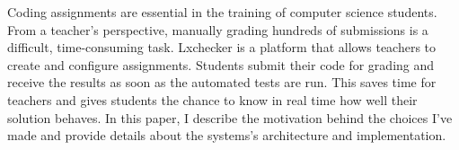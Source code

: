 
Coding assignments are essential in the training of computer science students. From a teacher's perspective, manually grading hundreds of submissions is a difficult, time-consuming task. Lxchecker is a platform that allows teachers to create and configure assignments. Students submit their code for grading and receive the results as soon as the automated tests are run. This saves time for teachers and gives students the chance to know in real time how well their solution behaves. In this paper, I describe the motivation behind the choices I've made and provide details about the systems's architecture and implementation.
